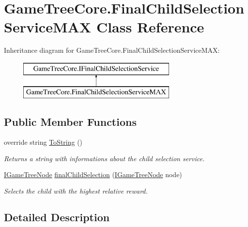 \hypertarget{class_game_tree_core_1_1_final_child_selection_service_m_a_x}{}\section{Game\+Tree\+Core.\+Final\+Child\+Selection\+Service\+M\+AX Class Reference}
\label{class_game_tree_core_1_1_final_child_selection_service_m_a_x}
Inheritance diagram for Game\+Tree\+Core.\+Final\+Child\+Selection\+Service\+M\+AX\+:\begin{figure}[H]
\begin{center}
\leavevmode
\includegraphics[height=2.000000cm]{class_game_tree_core_1_1_final_child_selection_service_m_a_x}
\end{center}
\end{figure}
\subsection*{Public Member Functions}
\begin{DoxyCompactItemize}
\item 
override string \mbox{\hyperlink{class_game_tree_core_1_1_final_child_selection_service_m_a_x_a56819f278cda4cf3a9b778cf53cca5c7}{To\+String}} ()
\begin{DoxyCompactList}\small\item\em Returns a string with informations about the child selection service. \end{DoxyCompactList}\item 
\mbox{\hyperlink{interface_game_tree_core_1_1_i_game_tree_node}{I\+Game\+Tree\+Node}} \mbox{\hyperlink{class_game_tree_core_1_1_final_child_selection_service_m_a_x_a15781c79f5979e4e60968463dd112fe4}{final\+Child\+Selection}} (\mbox{\hyperlink{interface_game_tree_core_1_1_i_game_tree_node}{I\+Game\+Tree\+Node}} node)
\begin{DoxyCompactList}\small\item\em Selects the child with the highest relative reward. \end{DoxyCompactList}\end{DoxyCompactItemize}


\subsection{Detailed Description}


